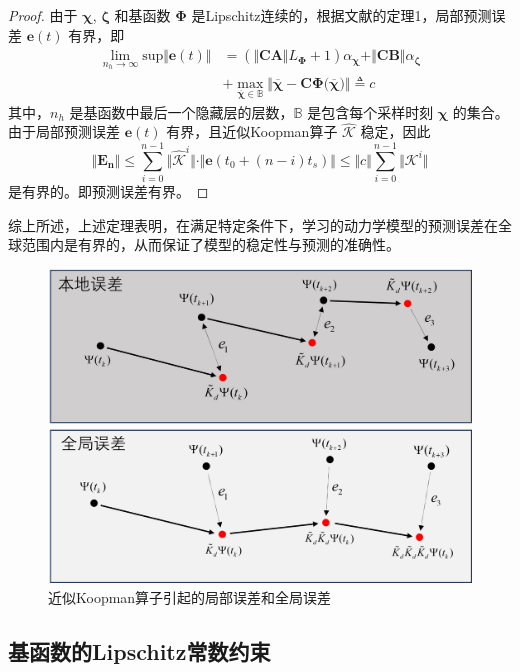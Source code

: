 \documentclass[lang=chs, degree=master, blindreview=false, winfonts=true]{yanputhesis}
\begin{document}
\begin{proof}
	由于 $\bm{\chi}$, $\bm{\zeta}$ 和基函数 $\bm{\Phi}$ 是Lipschitz连续的，根据文献\cite{Hao2024}的定理1，局部预测误差 $\bm{e}(t)$ 有界，即
	\[
	\begin{aligned}
		\lim_{n_h\rightarrow \infty} \text{sup} \Vert \bm{e}(t) \Vert &=(\Vert \bm{CA} \Vert L_{\bm{\Phi}}+1) \alpha_{\bm{\chi}}+\Vert \bm{CB}\Vert \alpha_{\bm{\zeta}} \\
		&+\max_{\overline{\bm{\chi}}\in \mathbb{B}} \Vert \overline{\bm{\chi}} -\bm{C}\bm{\Phi(\overline{\bm{\chi}}}) \Vert \triangleq c
	\end{aligned}
	\]
	其中，$n_h$ 是基函数中最后一个隐藏层的层数，$\mathbb{B}$ 是包含每个采样时刻 $\bm{\chi}$ 的集合。由于局部预测误差 $\bm{e}(t)$ 有界，且近似Koopman算子 $\hat{\bm{\mathcal{K}}}$ 稳定，因此
	\[
	\Vert \bm{E_n} \Vert \le \sum_{i=0}^{n-1}\Vert \hat{\bm{\mathcal{K}}}^i\Vert \cdot \Vert \bm{e}(t_0+(n-i)t_s) \Vert\le \Vert c \Vert \sum_{i=0}^{n-1}\Vert \bm{\mathcal{K}}^i \Vert
	\]
	是有界的。即预测误差有界。
\end{proof}


综上所述，上述定理表明，在满足特定条件下，学习的动力学模型的预测误差在全球范围内是有界的，从而保证了模型的稳定性与预测的准确性。
\begin{figure}[hbt!]
	\centering
	\includegraphics[width=30pc]{picture/3_2.png} 
	\caption{近似Koopman算子引起的局部误差和全局误差} \label{3_2}
\end{figure}
\subsection{基函数的Lipschitz常数约束}
\end{document}
